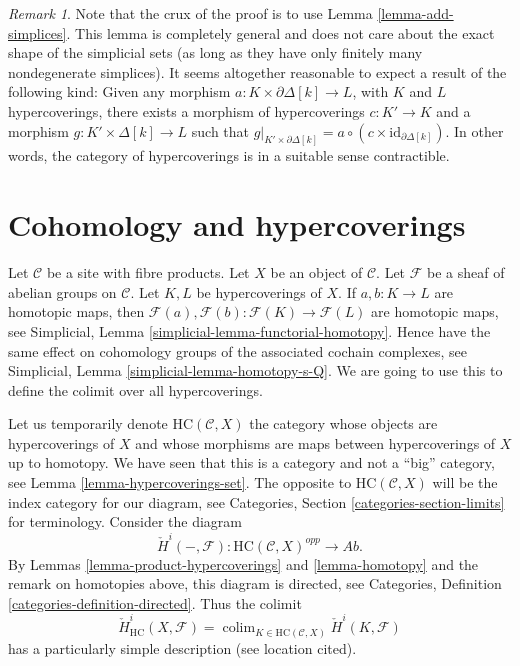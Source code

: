\documentclass{stacks-project}
\theoremstyle{plain}
\theoremstyle{definition}
\theoremstyle{remark}
\newtheorem{remark}[subsection]{Remark}
\numberwithin{equation}{subsection}
\def\colim{\mathop{\mathrm{colim}}\nolimits}
\begin{document}
\begin{remark}
\label{remark-contractible-category}
Note that the crux of the proof is to use
Lemma \ref{lemma-add-simplices}. This lemma
is completely general and does not care about the
exact shape of the simplicial sets (as long as they
have only finitely many nondegenerate simplices).
It seems altogether reasonable to expect a result
of the following kind:
Given any morphism $a : K \times \partial \Delta[k]
\to L$, with $K$ and $L$ hypercoverings, there
exists a morphism of hypercoverings $c : K' \to K$
and a morphism  $g : K' \times \Delta[k] \to L$
such that
$g|_{K' \times \partial \Delta[k]} =
a \circ (c \times \text{id}_{\partial \Delta[k]})$.
In other words, the category of hypercoverings is in
a suitable sense contractible.
\end{remark}

















\section{Cohomology and hypercoverings}
\label{section-cohomology}

\noindent
Let $\mathcal{C}$ be a site with fibre products.
Let $X$ be an object of $\mathcal{C}$.
Let $\mathcal{F}$ be a sheaf of abelian groups on $\mathcal{C}$.
Let $K, L$ be hypercoverings of $X$.
If $a, b : K \to L$ are homotopic maps,
then $\mathcal{F}(a), \mathcal{F}(b) : \mathcal{F}(K) \to \mathcal{F}(L)$
are homotopic maps, see
Simplicial, Lemma \ref{simplicial-lemma-functorial-homotopy}.
Hence have the same effect on cohomology groups of the associated
cochain complexes, see
Simplicial, Lemma \ref{simplicial-lemma-homotopy-s-Q}.
We are going to use this to define the colimit over all
hypercoverings.

\medskip\noindent
Let us temporarily denote $\text{HC}(\mathcal{C}, X)$
the category whose objects are hypercoverings of $X$
and whose morphisms are maps between hypercoverings of $X$
up to homotopy. We have seen that
this is a category and not a ``big'' category,
see Lemma \ref{lemma-hypercoverings-set}.
The opposite to $\text{HC}(\mathcal{C}, X)$
will be the index category for our diagram, see
Categories, Section \ref{categories-section-limits} for terminology.
Consider the diagram
$$
\check{H}^i(-, \mathcal{F}) :
\text{HC}(\mathcal{C}, X)^{opp}
\longrightarrow
\textit{Ab}.
$$
By Lemmas \ref{lemma-product-hypercoverings} and \ref{lemma-homotopy}
and the remark on homotopies above, this diagram is directed, see
Categories, Definition \ref{categories-definition-directed}.
Thus the colimit
$$
\check{H}^i_{\text{HC}}(X, \mathcal{F}) =
\colim_{K \in \text{HC}(\mathcal{C}, X)} \check{H}^i(K, \mathcal{F})
$$
has a particularly simple description (see location cited).
\end{document}
